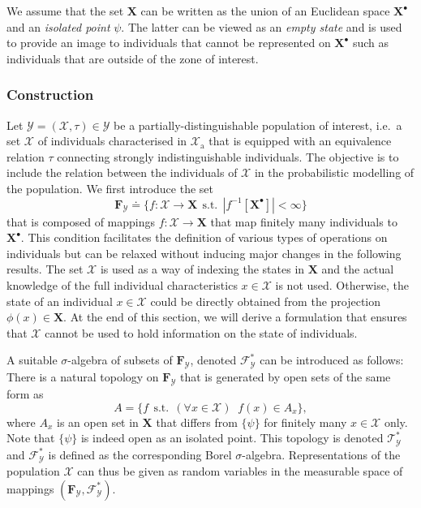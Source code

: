\documentclass{aptpub}
\numberwithin{equation}{section}
\begin{document}
We assume that the set ${\mathbf{X}}$ can be written as the union of an Euclidean space ${\mathbf{X}}^{\bullet}$ and an \emph{isolated point} $\psi$. The latter can be viewed as an \emph{empty state} and is used to provide an image to individuals that cannot be represented on ${\mathbf{X}}^{\bullet}$ such as individuals that are outside of the zone of interest.

\subsubsection{Construction}

Let ${\mathcal{Y}} = ({\mathcal{X}},\tau) \in {\boldsymbol{\mathcal{Y}}}$ be a partially-distinguishable population of interest, i.e.\ a set ${\mathcal{X}}$ of individuals characterised in ${\boldsymbol{\mathcal{X}}}_{\mathrm{a}}$ that is equipped with an equivalence relation $\tau$ connecting strongly indistinguishable individuals. The objective is to include the relation between the individuals of ${\mathcal{X}}$ in the probabilistic modelling of the population. We first introduce the set
{\begin{equation*}{
{\mathbf{F}}_{\mathcal{Y}} {\doteq} \big\{ f : {\mathcal{X}} \to {\mathbf{X}} {\;\,\mbox{s.t.}\;\,} |f^{-1}[{\mathbf{X}}^{\bullet}]| < \infty \big\}
}\end{equation*}}
that is composed of mappings $f : {\mathcal{X}} \to {\mathbf{X}}$ that map finitely many individuals to ${\mathbf{X}}^{\bullet}$. This condition facilitates the definition of various types of operations on individuals but can be relaxed without inducing major changes in the following results. The set ${\mathcal{X}}$ is used as a way of indexing the states in ${\mathbf{X}}$ and the actual knowledge of the full individual characteristics $x \in {\mathcal{X}}$ is not used. Otherwise, the state of an individual $x \in {\mathcal{X}}$ could be directly obtained from the projection $\phi(x) \in {\mathbf{X}}$. At the end of this section, we will derive a formulation that ensures that ${\boldsymbol{\mathcal{X}}}$ cannot be used to hold information on the state of individuals.

A suitable $\sigma$-algebra of subsets of ${\mathbf{F}}_{\mathcal{Y}}$, denoted ${\mathcal{F}}^*_{\mathcal{Y}}$ can be introduced as follows: There is a natural topology on ${\mathbf{F}}_{\mathcal{Y}}$ that is generated by open sets of the same form as
{\begin{equation*}{
A = \{ f {\;\,\mbox{s.t.}\;\,} {({\forall x \in {\mathcal{X}}})\;\;} f(x) \in A_x \},
}\end{equation*}}
where $A_x$ is an open set in ${\mathbf{X}}$ that differs from $\{\psi\}$ for finitely many $x \in {\mathcal{X}}$ only. Note that $\{\psi\}$ is indeed open as an isolated point. This topology is denoted ${\mathcal{T}}^*_{\mathcal{Y}}$ and ${\mathcal{F}}^*_{\mathcal{Y}}$ is defined as the corresponding Borel $\sigma$-algebra. Representations of the population ${\mathcal{X}}$ can thus be given as random variables in the measurable space of mappings $({\mathbf{F}}_{\mathcal{Y}},{\mathcal{F}}^*_{\mathcal{Y}})$.
\end{document}
